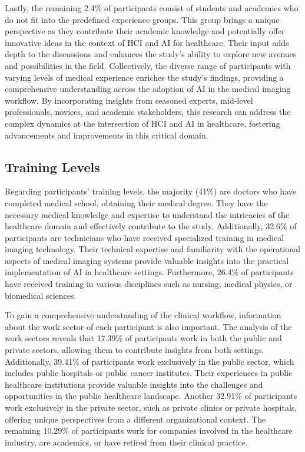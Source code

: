 Lastly, the remaining 2.4\% of participants consist of students and academics who do not fit into the predefined experience groups.
This group brings a unique perspective as they contribute their academic knowledge and potentially offer innovative ideas in the context of \ac{HCI} and \ac{AI} for healthcare.
Their input adds depth to the discussions and enhances the study's ability to explore new avenues and possibilities in the field.
Collectively, the diverse range of participants with varying levels of medical experience enriches the study's findings, providing a comprehensive understanding across the adoption of \ac{AI} in the medical imaging workflow.
By incorporating insights from seasoned experts, mid-level professionals, novices, and academic stakeholders, this research can address the complex dynamics at the intersection of \ac{HCI} and \ac{AI} in healthcare, fostering advancements and improvements in this critical domain.

\subsection{Training Levels}
\label{chap:app002003002}

Regarding participants' training levels, the majority (41\%) are doctors who have completed medical school, obtaining their medical degree.
They have the necessary medical knowledge and expertise to understand the intricacies of the healthcare domain and effectively contribute to the study.
Additionally, 32.6\% of participants are technicians who have received specialized training in medical imaging technology.
Their technical expertise and familiarity with the operational aspects of medical imaging systems provide valuable insights into the practical implementation of \ac{AI} in healthcare settings.
Furthermore, 26.4\% of participants have received training in various disciplines such as nursing, medical physics, or biomedical sciences.

To gain a comprehensive understanding of the clinical workflow, information about the work sector of each participant is also important.
The analysis of the work sectors reveals that 17.39\% of participants work in both the public and private sectors, allowing them to contribute insights from both settings.
Additionally, 39.41\% of participants work exclusively in the public sector, which includes public hospitals or public cancer institutes.
Their experiences in public healthcare institutions provide valuable insights into the challenges and opportunities in the public healthcare landscape.
Another 32.91\% of participants work exclusively in the private sector, such as private clinics or private hospitals, offering unique perspectives from a different organizational context.
The remaining 10.29\% of participants work for companies involved in the healthcare industry, are academics, or have retired from their clinical practice.

